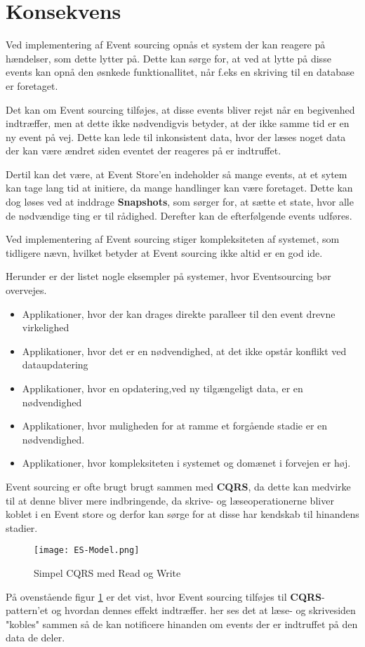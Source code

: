 \section{Konsekvens}
Ved implementering af Event sourcing opnås et system der kan reagere på hændelser, som dette lytter på. Dette kan sørge for, at ved at lytte på disse events kan opnå den øsnkede funktionallitet, når f.eks en skriving til en database er foretaget.

Det kan om Event sourcing tilføjes, at disse events bliver rejst når en begivenhed indtræffer, men at dette ikke nødvendigvis betyder, at der ikke samme tid er en ny event på vej. Dette kan lede til inkonsistent data, hvor der læses noget data der kan være ændret siden eventet der reageres på er indtruffet.

Dertil kan det være, at Event Store'en indeholder så mange events, at et sytem kan tage lang tid at initiere, da mange handlinger kan være foretaget. Dette kan dog løses ved at inddrage \textbf{Snapshots}, som sørger for, at sætte et state, hvor alle de nødvændige ting er til rådighed. Derefter kan de efterfølgende events udføres.

Ved implementering af Event sourcing stiger kompleksiteten af systemet, som tidligere nævn, hvilket betyder at Event sourcing ikke altid er en god ide. 

Herunder er der listet nogle eksempler på systemer, hvor Eventsourcing bør overvejes.
\begin{itemize}
	\item Applikationer, hvor der kan drages direkte paralleer til den event drevne virkelighed
	\item Applikationer, hvor det er en nødvendighed, at det ikke opstår konflikt ved dataupdatering 
	\item Applikationer, hvor en opdatering,ved ny tilgængeligt data, er en nødvendighed
	\item Applikationer, hvor muligheden for at ramme et forgående stadie er en nødvendighed.
	\item Applikationer, hvor kompleksiteten i systemet og domænet i forvejen er høj.
\end{itemize}

Event sourcing er ofte brugt brugt sammen med \textbf{CQRS}, da dette kan medvirke til at denne  bliver mere indbringende, da skrive- og læseoperationerne bliver koblet i en Event store og derfor kan sørge for at disse har kendskab til hinandens stadier.

\begin{figure}[H]
	\center
	\texttt{[image: ES-Model.png]}
	\caption{Simpel CQRS med Read og Write}
	\label{fig:cqrs-ES_model}
\end{figure}

På ovenstående figur \ref{fig:cqrs-ES_model} er det vist, hvor Event sourcing tilføjes til \textbf{CQRS}-pattern'et og hvordan dennes effekt indtræffer. her ses det at læse- og skrivesiden "kobles" sammen så de kan notificere hinanden om events der er indtruffet på den data de deler. 